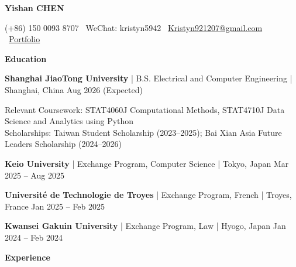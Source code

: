 \documentclass[11pt]{article}
\begin{document}
\begin{center}
    \textbf{\large Yishan CHEN}
\end{center}

\vspace{-20pt}
\begin{center}
    (+86) 150 0093 8707 \textbullet\
    WeChat: kristyn5942 \textbullet\
    \href{mailto:Kristyn921207@gmail.com}{Kristyn921207@gmail.com} \textbullet\
    \href{https://kristynchen.github.io/Personal-Website/}{Portfolio}
\end{center}

\vspace{-10pt}
\begin{center}
    \textbf{Education} \\
    \vspace{-5pt}
    \hrulefill
\end{center}
\vspace{-5pt}

\textbf{Shanghai JiaoTong University} | B.S. Electrical and Computer Engineering | Shanghai, China 
\hfill Aug 2026 (Expected)

Relevant Coursework: STAT4060J Computational Methods, STAT4710J Data Science and Analytics using Python \\
Scholarships: Taiwan Student Scholarship (2023--2025); Bai Xian Asia Future Leaders Scholarship (2024--2026)

\vspace{2pt}
\textbf{Keio University} | Exchange Program, Computer Science | Tokyo, Japan 
\hfill Mar 2025 -- Aug 2025  

\vspace{2pt}
\textbf{Université de Technologie de Troyes} | Exchange Program, French | Troyes, France 
\hfill Jan 2025 -- Feb 2025  

\vspace{2pt}
\textbf{Kwansei Gakuin University} | Exchange Program, Law | Hyogo, Japan 
\hfill Jan 2024 -- Feb 2024

\vspace{-5pt}
\begin{center}
    \textbf{Experience} \\
    \vspace{-5pt}
    \hrulefill
\end{center}
\vspace{-5pt}
\end{document}
